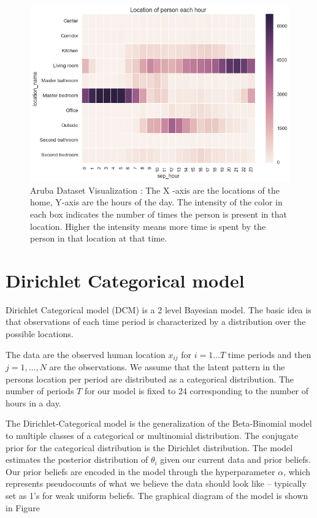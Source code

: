 \documentclass[11pt]{book}
\begin{document}
\begin{figure}[htp]
\centering
\includegraphics[width=\textwidth]{images/aruba-data.png}
\caption{Aruba Dataset Visualization : The X -axis are the locations of the home, Y-axis are the hours of the day. The intensity of the color in each box indicates the number of times the person is present in that location. Higher the intensity means more time is spent by the person in that location at that time.}
\label{aruba-visual}
\end{figure}


\section{Dirichlet Categorical model }

Dirichlet Categorical model (DCM) is a 2 level Bayesian model. The basic idea is that observations of each time period is characterized by a distribution over the possible locations.

The data are the observed human location $x_{ij}$ for $i = 1 \dots T$ time periods and then $j = 1, \dots , N$  are the observations.  We assume that the latent pattern in the persons location per period are distributed as a categorical distribution. The number of periods $T$ for our model is fixed to 24 corresponding to the number of hours in a day. 

The Dirichlet-Categorical model is the generalization of the Beta-Binomial model to multiple classes of a categorical or multinomial distribution. The conjugate prior for the categorical distribution is the Dirichlet distribution. The model estimates the posterior distribution of $\theta_i$ given our current data and prior beliefs. Our prior beliefs are encoded in the model through the hyperparameter $\alpha$, which represents pseudocounts of what we believe the data should look like – typically set as 1's for weak uniform beliefs. The graphical diagram of the model is shown in Figure \cite{dcm}
\end{document}
